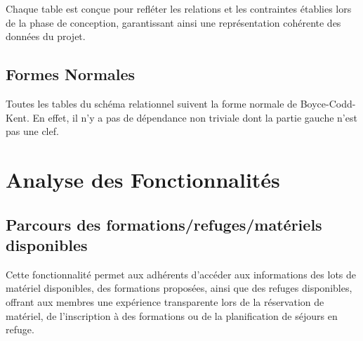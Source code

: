 Chaque table est conçue pour refléter les relations et les contraintes établies lors de la phase de conception, garantissant ainsi une représentation cohérente des données du projet.

\subsection{Formes Normales}
Toutes les tables du schéma relationnel suivent la forme normale de Boyce-Codd-Kent. En effet, il n'y a pas de dépendance non triviale dont la partie gauche n'est pas une clef.
\section{Analyse des Fonctionnalités}

\subsection{Parcours des formations/refuges/matériels disponibles}

\par Cette fonctionnalité permet aux adhérents d'accéder aux informations des lots de matériel disponibles, des formations proposées, ainsi que des refuges disponibles, offrant aux membres une expérience transparente lors de la réservation de matériel, de l'inscription à des formations ou de la planification de séjours en refuge.

